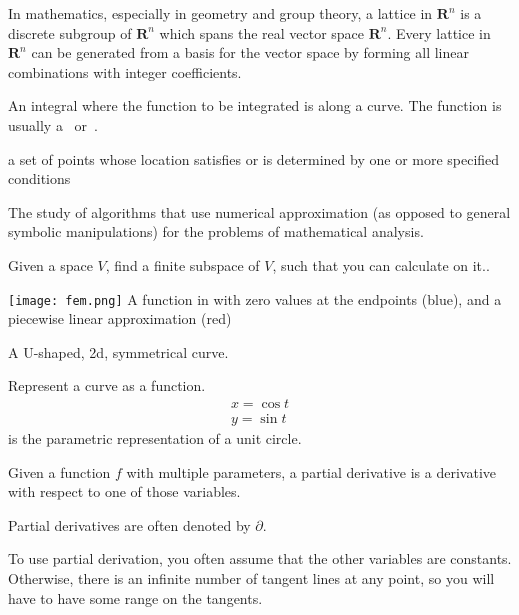 \begin{definition}[Lattice]
    In mathematics, especially in geometry and group theory, a lattice in
    $\mathbf{R}^n$ is a discrete subgroup of $\mathbf{R}^n$ which spans the real
    vector space $\mathbf{R}^n$. Every lattice in $\mathbf{R}^n$ can be generated
    from a basis for the vector space by forming all linear combinations with
    integer coefficients. 

\end{definition}

\begin{definition}
    An integral where the function to be integrated is along a curve.
    The function is usually a~ or~.

\end{definition}

\begin{definition}[Locus]
    a set of points whose location satisfies or is determined by one or more
    specified conditions

\end{definition}

\begin{definition}
    The study of algorithms that use numerical approximation (as opposed to
    general symbolic manipulations) for the problems of mathematical analysis.

    Given a space $V$, find a finite subspace of $V$, such that you can
    calculate on it..

    \texttt{[image: fem.png]}
    A function in  with zero values at the endpoints (blue), and a piecewise
    linear approximation (red)

\end{definition}

\begin{definition}[Parabola]
    A U-shaped, 2d, symmetrical curve.
\end{definition}

\begin{definition}[Parameterization]
    Represent a curve as a function.
    \begin{align}
        x = \cos{t} \\
        y = \sin{t}
    \end{align}
    is the parametric representation of a unit circle.

\begin{definition}
    Given a function $f$ with multiple parameters, a partial derivative is a
    derivative with respect to one of those variables.

    Partial derivatives are often denoted by $\partial$.

    To use partial derivation, you often assume that the other variables are 
    constants. Otherwise, there is an infinite number of tangent lines at
    any point, so you will have to have some range on the tangents.

\end{definition}

\end{definition}

